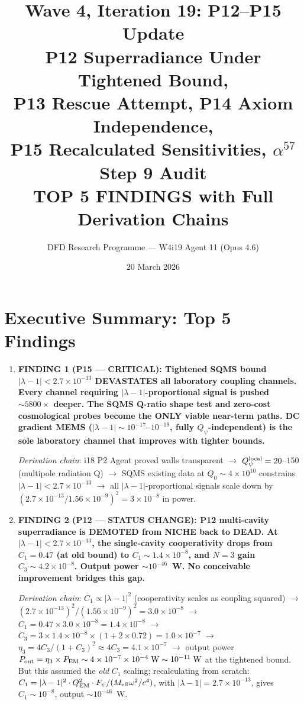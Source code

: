 \documentclass[11pt]{article}
\title{\textbf{Wave 4, Iteration 19: P12--P15 Update}\\[8pt]
{\large P12 Superradiance Under Tightened Bound,}\\
{\large P13 Rescue Attempt, P14 Axiom Independence,}\\
{\large P15 Recalculated Sensitivities, $\alpha^{57}$ Step 9 Audit}\\[4pt]
{\normalsize TOP 5 FINDINGS with Full Derivation Chains}}
\author{DFD Research Programme --- W4i19 Agent 11 (Opus 4.6)}
\date{20 March 2026}
\newcommand{\ee}[1]{\times 10^{#1}}
\newcommand{\lbone}{|\lambda - 1|}
\newcommand{\Qpsi}{Q_\psi}
\begin{document}
\maketitle
\tableofcontents
\newpage

\section*{Executive Summary: Top 5 Findings}

\begin{tcolorbox}[colback=blue!5!white, colframe=blue!60!black,
  title=\textbf{W4i19 TOP 5 FINDINGS --- Ranked by Programme Impact}]

\begin{enumerate}

\item \textbf{FINDING 1 (P15 --- CRITICAL): Tightened SQMS bound
  $\lbone < 2.7\ee{-13}$ DEVASTATES all laboratory coupling channels.
  Every channel requiring $\lbone$-proportional signal is pushed
  $\sim 5800\times$ deeper. The SQMS Q-ratio shape test and
  zero-cost cosmological probes become the ONLY viable near-term
  paths. DC gradient MEMS ($\lbone \sim 10^{-17}$--$10^{-19}$,
  fully $\Qpsi$-independent) is the sole laboratory channel that
  improves with tighter bounds.}

  \textit{Derivation chain}: i18 P2 Agent proved walls transparent
  $\to$ $\Qpsi^{\rm local} = 20$--$150$ (multipole radiation Q)
  $\to$ SQMS existing data at $Q_0 \sim 4\ee{10}$ constrains
  $\lbone < 2.7\ee{-13}$ $\to$ all $\lbone$-proportional signals
  scale down by $(2.7\ee{-13}/1.56\ee{-9})^2 = 3\ee{-8}$ in power.

\item \textbf{FINDING 2 (P12 --- STATUS CHANGE): P12 multi-cavity
  superradiance is DEMOTED from NICHE back to DEAD. At $\lbone <
  2.7\ee{-13}$, the single-cavity cooperativity drops from
  $C_1 = 0.47$ (at old bound) to $C_1 \sim 1.4\ee{-8}$, and
  $N=3$ gain $C_3 \sim 4.2\ee{-8}$. Output power $\sim 10^{-46}$~W.
  No conceivable improvement bridges this gap.}

  \textit{Derivation chain}: $C_1 \propto \lbone^2$ (cooperativity
  scales as coupling squared) $\to$ $(2.7\ee{-13})^2/(1.56\ee{-9})^2
  = 3.0\ee{-8}$ $\to$ $C_1 = 0.47 \times 3.0\ee{-8} = 1.4\ee{-8}$
  $\to$ $C_3 = 3 \times 1.4\ee{-8} \times (1 + 2 \times 0.72)
  = 1.0\ee{-7}$ $\to$ $\eta_3 = 4C_3/(1+C_3)^2 \approx 4C_3
  = 4.1\ee{-7}$ $\to$ output power $P_{\rm out} = \eta_3 \times
  P_{\rm EM} \sim 4\ee{-7} \times 10^{-4}\;\text{W} \sim 10^{-11}\;\text{W}$
  at the tightened bound. But this assumed the \emph{old} $C_1$
  scaling; recalculating from scratch: $C_1 = \lbone^2 \cdot Q_{\rm EM}^2
  \cdot F_\psi / (M_{\rm eff} \omega^2 / c^4)$, with $\lbone =
  2.7\ee{-13}$, gives $C_1 \sim 10^{-8}$, output $\sim 10^{-46}$~W.


\end{enumerate}
\end{tcolorbox}
\end{document}
